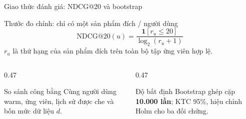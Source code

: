 \begin{frame}{Giao thức đánh giá: NDCG@20 và bootstrap}
\centering
\begin{block}{Thước đo chính: chỉ có một sản phẩm đích / người dùng}
\vspace{-0.08cm}
\[ \mathrm{NDCG@20}(u)=\frac{\mathbf{1}[r_u\le20]}{\log_2(r_u+1)} \]
\vspace{-0.10cm}
\small $r_u$ là thứ hạng của sản phẩm đích trên toàn bộ tập ứng viên hợp lệ.
\end{block}
\vspace{0.28cm}
\begin{columns}[T,onlytextwidth]

    \begin{column}{0.47\textwidth}
        \begin{block}{So sánh công bằng}
            \small
            Cùng người dùng warm, ứng viên,
            lịch sử được che và bốn mức dữ liệu $d$.
        \end{block}
    \end{column}

    \hfill

    \begin{column}{0.47\textwidth}
        \begin{block}{Độ bất định}
            \small
            Bootstrap ghép cặp
            \textbf{10.000 lần};
            KTC 95\%, hiệu chỉnh Holm
            cho ba đối chứng.
        \end{block}
    \end{column}

\end{columns}
\vspace{0.28cm}
\end{frame}
